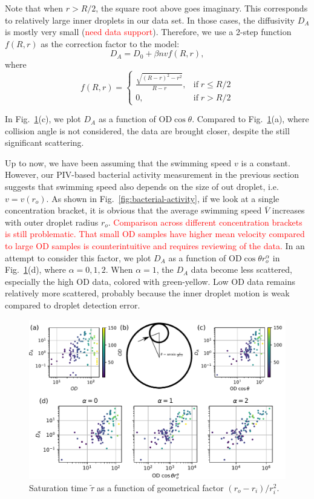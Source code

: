 \documentclass[%
10pt,
superscriptaddress,
twocolumn,
 amsmath,amssymb,
 aps,prx,
]{revtex4-2}
\begin{document}
%
Note that when $r>R/2$, the square root above goes imaginary. This corresponds to relatively large inner droplets in our data set. In those cases, the diffusivity $D_A$ is mostly very small (\textcolor{red}{need data support}). Therefore, we use a 2-step function $f(R, r)$ as the correction factor to the model:
%
\begin{equation}
  D_A = D_0 + \beta n v f(R, r),
\end{equation}
%
where
$$
  f(R, r) =
  \begin{cases}
  \frac{\sqrt{(R-r)^2-r^2}}{R-r}, & \text{if}\; r\le R/2 \\
  0, & \text{if}\; r > R/2
  \end{cases}
$$
%

In Fig.~\ref{fig:collision-angle}(c), we plot $D_A$ as a function of OD$\cos\theta$. 
Compared to Fig.~\ref{fig:collision-angle}(a), where collision angle is not considered, the data are brought closer, despite the still significant scattering. 

Up to now, we have been assuming that the swimming speed $v$ is a constant. 
However, our PIV-based bacterial activity measurement in the previous section suggests that swimming speed also depends on the size of out droplet, i.e. $v = v(r_o)$. 
As shown in Fig.~\ref{fig:bacterial-activity}, if we look at a single concentration bracket, it is obvious that the average swimming speed $\overline V$ increases with outer droplet radius $r_o$.
\textcolor{red}{Comparison across different concentration brackets is still problematic. That small OD samples have higher mean velocity compared to large OD samples is counterintuitive and requires reviewing of the data.}
In an attempt to consider this factor, we plot $D_A$ as a function of $\text{OD}\cos\theta r_o^\alpha$ in Fig.~\ref{fig:collision-angle}(d), where $\alpha=0,1,2$.
When $\alpha=1$, the $D_A$ data become less scattered, especially the high OD data, colored with green-yellow. 
Low OD data remains relatively more scattered, probably because the inner droplet motion is weak compared to droplet detection error.

\begin{figure}
  \centering
  \includegraphics[width=\textwidth]{collision-angle-figure}
  \caption{Saturation time $\tilde\tau$ as a function of geometrical factor $(r_o-r_i)/r_i^2$.}
  \label{fig:collision-angle}
\end{figure}
\end{document}
